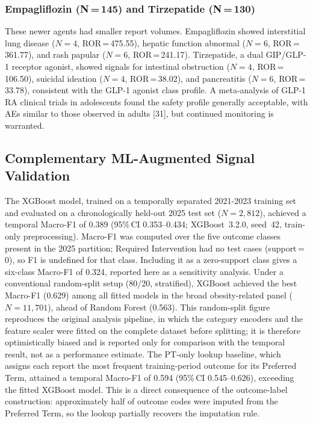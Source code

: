 \documentclass[10pt,a4paper]{article}
\begin{document}
\subsubsection{Empagliflozin (N\,=\,145) and Tirzepatide (N\,=\,130)}
These newer agents had smaller report volumes. Empagliflozin showed interstitial 
lung disease ($N=4$, ROR\,=\,475.55), hepatic function abnormal ($N=6$, ROR\,=\,361.77), and rash 
papular ($N=6$, ROR\,=\,241.17). Tirzepatide, a dual GIP/GLP-1 receptor agonist, showed signals for intestinal obstruction ($N=4$, ROR\,=\,106.50), suicidal ideation ($N=4$, ROR\,=\,38.02), and pancreatitis ($N=6$, ROR\,=\,33.78), consistent with the GLP-1 agonist class profile. A meta-analysis of GLP-1 RA clinical trials in adolescents found the safety profile generally acceptable, with AEs similar to those observed in adults [31], but continued monitoring is warranted.


\subsection{Complementary ML-Augmented Signal Validation}
The XGBoost model, trained on a temporally separated 2021-2023 training set and evaluated on a chronologically held-out 2025 test set ($N=2{,}812$), achieved a temporal Macro-F1 of 0.389 (95\%\,CI 0.353--0.434; XGBoost~3.2.0, seed~42, train-only preprocessing). Macro-F1 was computed over the five outcome classes present in the 2025 partition; Required Intervention had no test cases (support\,=\,0), so F1 is undefined for that class. Including it as a zero-support class gives a six-class Macro-F1 of 0.324, reported here as a sensitivity analysis. Under a conventional random-split setup (80/20, stratified), XGBoost achieved the best Macro-F1 (0.629) among all fitted models in the broad obesity-related panel ($N=11{,}701$), ahead of Random Forest (0.563). This random-split figure reproduces the original analysis pipeline, in which the category encoders and the feature scaler were fitted on the complete dataset before splitting; it is therefore optimistically biased and is reported only for comparison with the temporal result, not as a performance estimate. The PT-only lookup baseline, which assigns each report the most frequent training-period outcome for its Preferred Term, attained a temporal Macro-F1 of 0.594 (95\%\,CI 0.545--0.626), exceeding the fitted XGBoost model. This is a direct consequence of the outcome-label construction: approximately half of outcome codes were imputed from the Preferred Term, so the lookup partially recovers the imputation rule.
\end{document}
